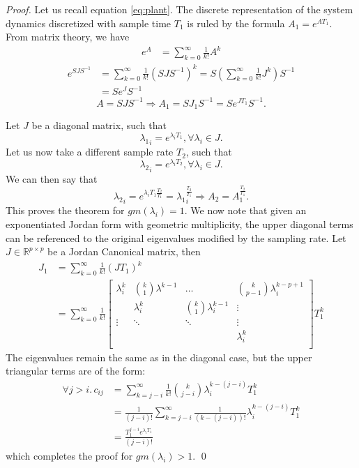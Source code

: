 \documentclass[sigconf]{llncs}
\newcommand{\mat}[1]{{#1}}
\renewcommand{\vec}[1]{{#1}}
\begin{document}
 \begin{proof}
 Let us recall equation \ref{eq:plant}. The discrete representation of the system dynamics discretized with sample time $T_1$ is ruled by the formula
 $\mat{A}_1 = e^{\mat{A} T_1}$. From matrix theory, we have 
\begin{align*}
 e^{\mat{A}}&=\sum_{k=0}^\infty \frac{1}{k!}\mat{A}^k
\end{align*} 
\begin{align*} 
 e^{\mat{S}\mat{J}\mat{S}^{-1}}&=\sum_{k=0}^\infty \frac{1}{k!}\left(\mat{S}\mat{J}\mat{S}^{-1}\right)^k
 =\mat{S} \left (\sum_{k=0}^\infty \frac{1}{k!}\mat{J}^k\right) \mat{S}^{-1}\nonumber\\
 &=\mat{S}e^{\mat{J}}\mat{S}^{-1}
\end{align*} 
\begin{equation*}
\mat{A}=\mat{S}\mat{J}\mat{S}^{-1} \Rightarrow \vec{A}_1 = \mat{S}\mat{J}_1\mat{S}^{-1}= \mat{S}e^{\mat{J} T_1}\mat{S}^{-1}.
 \end{equation*}
 
 Let $\mat{J}$ be a diagonal matrix, such that 
 $${\lambda_1}_i=e^{\lambda_i T_1}, \forall \lambda_i \in \mat{J}.$$
 Let us now take a different sample rate $T_2$, such that 
 $${\lambda_2}_i=e^{\lambda_i T_2}, \forall \lambda_i \in \mat{J}.$$
 We can then say that 
 \begin{equation*}
 {\lambda_2}_i=e^{\lambda_i T_1 \frac{T_2}{T_1}}={\lambda_1}_i^{\frac{T_2}{T_1}} \Rightarrow A_2=A_1^{\frac{T_2}{T_1}}.
 \end{equation*}
 This proves the theorem for $gm(\lambda_i)=1$.
 We now note that given an exponentiated Jordan form with geometric multiplicity, the upper diagonal terms can be
 referenced to the original eigenvalues modified by the sampling rate.
  Let $\mat{J}\in \mathbb{R}^{p \times p}$ be a Jordan Canonical matrix, then
\begin{align*}
 \mat{J}_1&=\sum_{k=0}^\infty \frac{1}{k!}\left(\mat{J}T_1\right)^k\nonumber\\
 &=\sum_{k=0}^\infty \frac{1}{k!} \left [ \begin{array}{cccc}
 \lambda_i^k  & \binom{k}{1}  \lambda^{k-1} & \hdots  & \binom{k}{p-1} \lambda_i^{k-p+1} \\
& \lambda_i^k  & \binom{k}{1}  \lambda_i^{k-1} & \vdots \\
\vdots & \ddots & \ddots & \vdots \\
& &  &\lambda_i^k \\
\end{array} \right ] T_1^k
\end{align*}
The eigenvalues remain the same as in the diagonal case, but the upper triangular terms are of the form:
\begin{align*}
\forall j>i.\, c_{ij}&=\sum_{k=j-i}^\infty \frac{1}{k!}\binom{k}{j-i} \lambda_i^{k-(j-i)}T_1^k\\
&=\frac{1}{(j-i)!}\sum_{k=j-i}^\infty \frac{1}{(k-(j-i))!} \lambda_i^{k-(j-i)}T_1^k\nonumber\\
&=\frac{T_1^{j-i}e^{\lambda_i T_1}}{(j-i)!}\nonumber
\end{align*}
which completes the proof for $gm(\lambda_i)>1$. \qed
\end{proof}
\end{document}

